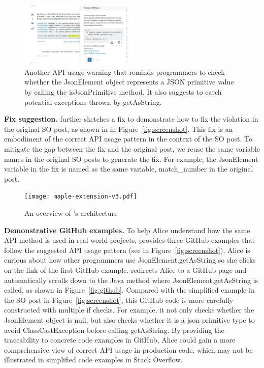 \begin{figure}
\centering
\includegraphics[width=0.5\textwidth]{soap-v4-2.pdf}
  \caption{Another API usage warning that reminds programmers to check whether the {\ttt JsonElement} object represents a {\ttt JSON} primitive value by calling the {\ttt isJsonPrimitive} method. It also suggests to catch potential exceptions thrown by {\ttt getAsString}.}
  \label{fig:screenshot2}
\end{figure}

{\bf Fix suggestion.} {\tool} further sketches a fix to demonstrate how to fix the violation in the original SO post, as shown in  in Figure~\ref{fig:screenshot}. This fix is an embodiment of the correct API usage pattern in the context of the SO post. To mitigate the gap between the fix and the original post, we reuse the same variable names in the original SO posts to generate the fix. For example, the {\ttt JsonElement} variable in the fix is named as the same variable, {\ttt match\_number} in the original post.

\begin{figure}[!th]
\centering
\texttt{[image: maple-extension-v3.pdf]}
\caption{An overview of {\tool}'s architecture}
\label{fig:arch}
\end{figure}

{\bf Demonstrative GitHub examples.} To help Alice understand how the same API method is used in real-world projects, {\tool} provides three GitHub examples that follow the suggested API usage pattern (see  in Figure~\ref{fig:screenshot}). Alice is curious about how other programmers use {\ttt JsonElement.getAsString} so she clicks on the link of the first GitHub example. {\tool} redirects Alice to a GitHub page and automatically scrolls down to the Java method where {\ttt JsonElement.getAsString} is called, as shown in Figure~\ref{fig:github}. Compared with the simplified example in the SO post in Figure~\ref{fig:screenshot}, this GitHub code is more carefully constructed with multiple {\ttt if} checks. For example, it not only checks whether the {\ttt JsonElement} object is {\ttt null}, but also checks whether it is a json primitive type to avoid {\ttt ClassCastException} before calling {\ttt getAsString}. By providing the traceability to concrete code examples in GitHub, Alice could gain a more comprehensive view of correct API usage in production code, which may not be illustrated in simplified code examples in Stack Overflow. 

